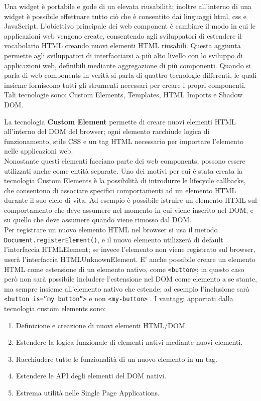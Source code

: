 Una widget è portabile e gode di un elevata riusabilità; inoltre all’interno di una widget è possibile effettuare tutto ciò che è consentito dai linguaggi html, css e JavaScript. 
L’obiettivo principale dei web component è cambiare il modo in cui le applicazioni web vengono create, consentendo agli sviluppatori di estendere il vocabolario HTML creando nuovi elementi HTML riusabili. Questa aggiunta permette agli sviluppatori di interfacciarsi a più alto livello con lo sviluppo di applicazioni web, definibili mediante aggregazione di più componenti.
Quando si parla di web components in verità si parla di quattro tecnologie differenti, le quali insieme forniscono tutti gli strumenti necessari per creare i propri componenti.
Tali tecnologie sono: Custom Elements, Templates, HTML Imports e Shadow DOM. 

La tecnologia \textbf{Custom Element} permette di creare nuovi elementi HTML all’interno del DOM del browser; ogni elemento racchiude logica di funzionamento, stile CSS e un tag HTML necessario per importare l’elemento nelle applicazioni web.
\\
Nonostante questi elementi facciano parte dei web components, possono essere utilizzati anche come entità separate. Uno dei motivi per cui è stata creata la tecnologia Custom Elements è la possibilità di introdurre le lifecycle callbacks, che consentono di associare specifici comportamenti ad un elemento HTML durante il suo ciclo di vita. Ad esempio è possibile istruire un elemento HTML sul comportamento che deve assumere nel momento in cui viene inserito nel DOM, e su quello che deve assumere quando viene rimosso dal DOM.
\\
Per registrare un nuovo elemento HTML nel browser si usa il metodo \texttt{Document.registerElement()}, e il nuovo elemento utilizzerà di default l’interfaccia HTMLElement; se invece l’elemento non viene registrato sul browser, userà l’interfaccia HTMLUnknownElement. E’ anche possibile creare un elemento HTML come estensione di un elemento nativo, come \texttt{<button>}; in questo caso però non sarà possibile includere l’estensione nel DOM come elemento a se stante, ma sempre insieme all’elemento nativo che estende; ad esempio l’inclusione sarà \texttt{<button is=”my button”>} e non \texttt{<my-button>} .
I vantaggi apportati dalla tecnologia custom elements sono:
\begin{enumerate}
\item Definizione e creazione di nuovi elementi HTML/DOM.
\item Estendere la logica funzionale di elementi nativi mediante nuovi elementi.
\item Racchiudere tutte le funzionalità di un nuovo elemento in un tag.
\item Estendere le API degli elementi del DOM nativi.
\item Estrema utilità nelle Single Page Applications.
\end{enumerate}
